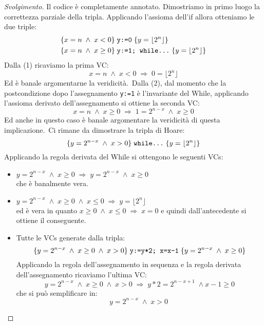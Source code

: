 \begin{proof}[Svolgimento]
Il codice è completamente annotato. Dimostriamo in primo luogo la correttezza parziale della tripla. Applicando l'assioma dell'if allora otteniamo le due triple:
\begin{align}
& \{x=n \; \land \; x<0 \} \; \text{\texttt{y:=0}} \; \{y= \lfloor 2^n \rfloor \} \\
& \{x=n \; \land \; x \geq 0 \} \; \text{\texttt{y:=1; while}} \texttt{\dots } \; \{ y= \lfloor 2^n \rfloor \}
\end{align}
Dalla (1) ricaviamo la prima VC:
\[ x = n \; \land \; x<0 \; \Rightarrow \; 0 = \lfloor 2^n \rfloor \]
Ed è banale argomentarne la veridicità.\
Dalla (2), dal momento che la postcondizione dopo l'assegnamento \texttt{y:=1} è l'invariante del While, applicando l'assioma derivato dell'assegnamento si ottiene la seconda VC:
\[ x=n \; \land \; x \geq 0 \; \Rightarrow \; 1 = 2^{n-x} \; \land \; x \geq 0 \]
Ed anche in questo caso è banale argomentare la veridicità di questa implicazione.\
Ci rimane da dimostrare la tripla di Hoare:
\[ \{ y=2^{n-x} \; \land \; x>0 \} \; \text{\texttt{while}} \texttt{\dots } \; \{y= \lfloor 2^n \rfloor \} \]
Applicando la regola derivata del While si ottengono le seguenti VCs:
\begin{itemize}
        \item $ y=2^{n-x} \; \land \; x \geq 0 \; \Rightarrow \; y=2^{n-x} \; \land \; x \geq 0 $ \\
                  che è banalmente vera.
        \item $ y=2^{n-x} \; \land \; x \geq 0 \; \land \; x \leq 0 \; \Rightarrow \; y = \lfloor 2^n \rfloor $ \\
                  ed è vera in quanto $ x \geq 0 \; \land \; x \leq 0 \; \Rightarrow \; x = 0 $ e quindi
                  dall'antecedente si ottiene il conseguente.
        \item Tutte le VCs generate dalla tripla:
                  \[ \{y=2^{n-x} \; \land \; x \geq 0 \; \land \; x>0 \} \;
                     \text{\texttt{y:=y*2; x=x-1}}
                     \; \{y=2^{n-x} \; \land \; x \geq 0 \} \]
                  Applicando la regola dell'assegnamento in sequenza e la regola derivata dell'assegnamento ricaviamo
                  l'ultima VC:
                  \[ y=2^{n-x} \; \land \;  x \geq 0 \; \land \; x>0 \;
                         \Rightarrow
                         \; y*2 = 2^{n-x+1} \; \land x-1 \geq 0 \]
                  che si può semplificare in:
                  \[ y=2^{n-x} \; \land \; x>0 \;
\]
\end{itemize}
\end{proof}
